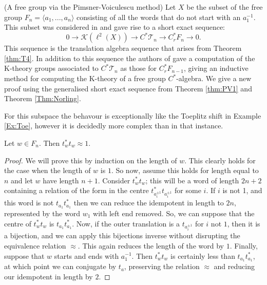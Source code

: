 \begin{example}\label{ex:PV}(A free group via the Pimsner-Voiculescu method)
Let $X$ be the subset of the free group $F_{n}=\langle a_{1},...,a_{n} \rangle$ consisting of all the words that do not start with an $a_{1}^{-1}$. This subset was considered in \cite{MR670181} and gave rise to a short exact sequence:
\begin{equation*}
0 \rightarrow \mathcal{K}(\ell^{2}(X)) \rightarrow C^{*}\mathcal{T}_{n} \rightarrow C^{*}_{r}F_{n} \rightarrow 0.
\end{equation*}
This sequence is the translation algebra sequence that arises from Theorem \ref{thm:T4}. In addition to this sequence the authors of \cite{MR670181} gave a computation of the K-theory groups associated to $C^{*}\mathcal{T}_{n}$ as those for $C^{*}_{r}F_{n-1}$, giving an inductive method for computing the K-theory of a free group $C^{*}$-algebra. We give a new proof using the generalised short exact sequence from Theorem \ref{thm:PV1} and Theorem \ref{Thm:Norling}.

For this subspace the behavour is exceptionally like the Toeplitz shift in Example \ref{Ex:Toe}, however it is decidedly more complex than in that instance.

\begin{claim}
Let $w \in F_{n}$. Then $t_{w}^{*}t_{w}\approx 1$.
\end{claim}
\begin{proof}
We will prove this by induction on the length of $w$. This clearly holds for the case when the length of $w$ is $1$. So now, assume this holds for length equal to $n$ and let $w$ have length $n+1$. Consider $t_{w}^{*}t_{w}$; this will be a word of length $2n+2$ containing a relation of the form in the centre $t_{a_{i}^{\pm 1}}^{*}t_{a_{i}^{\pm 1}}$ for some $i$. If $i$ is not 1, and this word is not $t_{a_{1}}t_{a_{1}}^{*}$ then we can reduce the idempotent in length to $2n$, represented by the word $w_{1}$ with left end removed. So, we can suppose that the centre of $t_{w}^{*}t_{w}$ is $t_{a_{1}}t_{a_{1}}^{*}$. Now, if the outer translation is a $t_{a_{i}^{\pm 1}}$ for $i$ not $1$, then it is a bijection, and we can apply this bijections inverse without disrupting the equivalence relation $\approx$. This again reduces the length of the word by $1$. Finally, suppose that $w$ starts and ends with $a_{1}^{-1}$. Then $t_{w}^{*}t_{w}$ is certainly less than $t_{a_{1}}t_{a_{1}}^{*}$, at which point we can conjugate by $t_{a}$, preserving the relation $\approx$ and reducing our idempotent in length by $2$. 
\end{proof}


\end{example}
